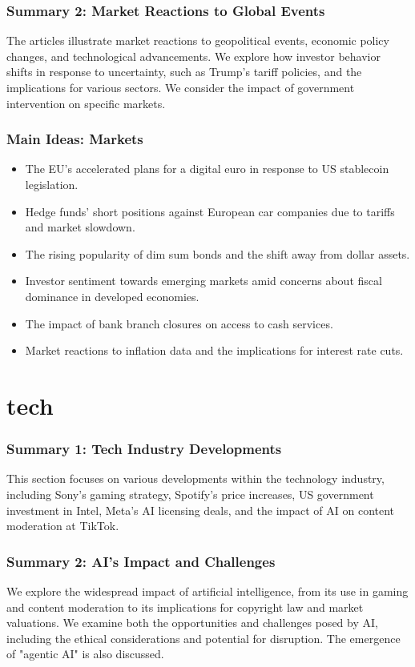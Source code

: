 \documentclass{beamer}
\begin{document}
\begin{frame}
\frametitle{Summary 2: Market Reactions to Global Events}
The articles illustrate market reactions to geopolitical events, economic policy changes, and technological advancements. We explore how investor behavior shifts in response to uncertainty, such as Trump's tariff policies, and the implications for various sectors.  We consider the impact of government intervention on specific markets.
\end{frame}

\begin{frame}
\frametitle{Main Ideas: Markets}
\begin{itemize}
    \item The EU's accelerated plans for a digital euro in response to US stablecoin legislation.
    \item Hedge funds' short positions against European car companies due to tariffs and market slowdown.
    \item The rising popularity of dim sum bonds and the shift away from dollar assets.
    \item Investor sentiment towards emerging markets amid concerns about fiscal dominance in developed economies.
    \item The impact of bank branch closures on access to cash services.
    \item Market reactions to inflation data and the implications for interest rate cuts.
\end{itemize}
\end{frame}


\section{tech}

\begin{frame}
\frametitle{Summary 1: Tech Industry Developments}
This section focuses on various developments within the technology industry, including Sony's gaming strategy, Spotify's price increases, US government investment in Intel, Meta's AI licensing deals, and the impact of AI on content moderation at TikTok.
\end{frame}

\begin{frame}
\frametitle{Summary 2: AI's Impact and Challenges}
We explore the widespread impact of artificial intelligence, from its use in gaming and content moderation to its implications for copyright law and market valuations. We examine both the opportunities and challenges posed by AI, including the ethical considerations and potential for disruption.  The emergence of "agentic AI" is also discussed.
\end{frame}
\end{document}

